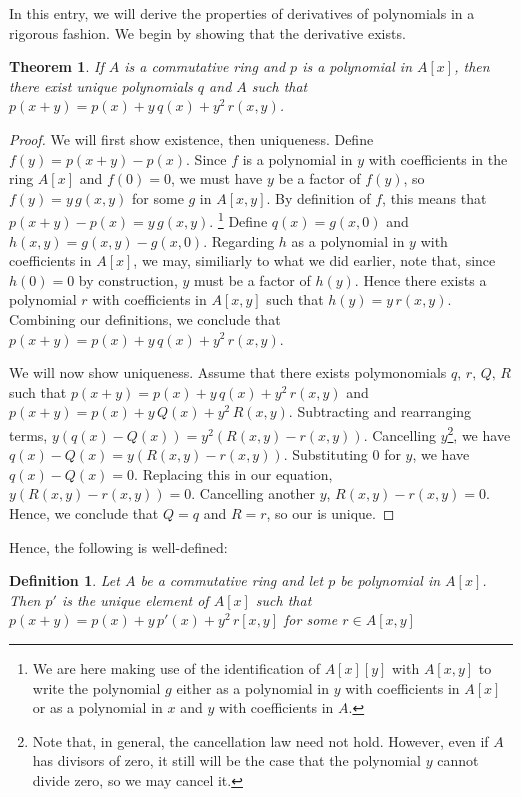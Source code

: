 \documentclass[12pt]{article}
\newtheorem{thm}{Theorem}
\newtheorem{dfn}{Definition}
\begin{document}
In this entry, we will derive the properties of derivatives
of polynomials in a rigorous fashion.  We begin by showing
that the derivative exists.

\begin{thm}  
If $A$ is a commutative ring and $p$ is a polynomial in 
$A[x]$, then there exist unique polynomials $q$ and $A$ 
such that $p(x+y) = p(x) + y \, q(x) + y^2 \, r(x,y)$.
\end{thm}

\begin{proof}
We will first show existence, then uniqueness.  Define $f(y) 
= p(x+y) - p(x)$.  Since $f$ is a polynomial in $y$ with
coefficients in the ring $A[x]$ and $f(0) = 0$, we must have
$y$ be a factor of $f(y)$, so $f(y) = y\,g(x,y)$ for some $g$ 
in $A[x,y]$.  By definition of $f$, this means that $p(x+y) -
p(x) = y\,g(x,y)$. \footnote{We are here making use of the
identification of $A[x][y]$ with $A[x,y]$ to write the
polynomial $g$ either as a polynomial in $y$ with coefficients
in $A[x]$ or as a polynomial in $x$ and $y$ with coefficients
in $A$.}  Define $q(x) = g(x,0)$ and $h(x,y) = g(x,y) - g(x,0)$.
Regarding $h$ as a polynomial in $y$ with coefficients in
$A[x]$, we may, similiarly to what we did earlier, note that,
since $h(0) = 0$ by construction, $y$ must be a factor of $h(y)$.
Hence there exists a polynomial $r$ with coefficients in $A[x,y]$ 
such that $h(y) = y \, r(x,y)$.  Combining our definitions, we
conclude that $p(x+y) = p(x) + y \, q(x) + y^2 \, r(x,y)$.

We will now show uniqueness.  Assume that there
exists polymonomials $q,\,r,\,Q,\,R$ such that $p(x+y) = p(x) + y \, 
q(x) + y^2 \, r(x,y)$ and $p(x+y) = p(x) + y \, Q(x) + y^2 \, 
R(x,y)$.  Subtracting and rearranging terms, $y (q(x) - Q(x)) =
y^2 (R(x,y) - r(x,y))$.  Cancelling $y$\footnote{Note that, in
general, the cancellation law need not hold.  However, even if
$A$ has divisors of zero, it still will be the case that the
polynomial $y$ cannot divide zero, so we may cancel it.}, 
we have $q(x) - Q(x) = y (R(x,y) - r(x,y))$.  Substituting 
$0$ for $y$, we have $q(x) - Q(x) = 0$.  Replacing this in our
equation, $y (R(x,y) - r(x,y)) = 0$.  Cancelling another $y$,
$R(x,y) - r(x,y) = 0$.  Hence, we conclude that $Q = q$ and
$R = r$, so our  is unique.
\end{proof}

Hence, the following is well-defined:

\begin{dfn}
Let $A$ be a commutative ring and let $p$ be polynomial in
$A[x]$.  Then $p'$ is the unique element of $A[x]$ such that
$p(x+y) = p(x) + y \, p'(x) + y^2 \, r[x,y]$ for some
$r \in A[x,y]$
\end{dfn}
\end{document}

